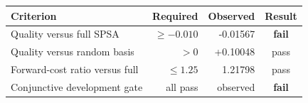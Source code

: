 \begin{tabular}{@{}lrrc@{}}
\toprule
Criterion & Required & Observed & Result \\
\midrule
Quality versus full SPSA & $\geq -0.010$ & -0.01567 & \textbf{fail} \\
Quality versus random basis & $>0$ & +0.10048 & pass \\
Forward-cost ratio versus full & $\leq 1.25$ & 1.21798 & pass \\
Conjunctive development gate & all pass & observed & \textbf{fail} \\
\bottomrule
\end{tabular}
